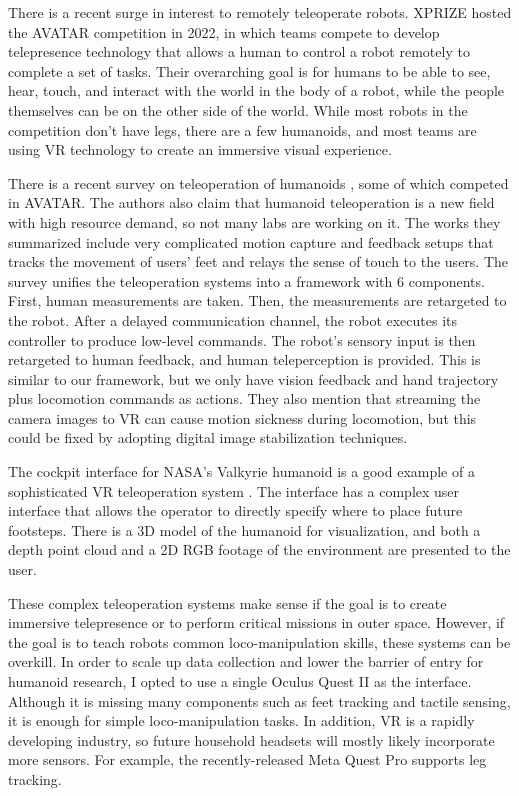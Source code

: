 There is a recent surge in interest to remotely teleoperate robots. 
XPRIZE hosted the AVATAR competition in 2022, in which teams compete to develop telepresence technology that allows a human to control a robot remotely to complete a set of tasks. 
Their overarching goal is for humans to be able to see, hear, touch, and interact with the world in the body of a robot, while the people themselves can be on the other side of the world.
While most robots in the competition don't have legs, there are a few humanoids, and most teams are using VR technology to create an immersive visual experience.

There is a recent survey on teleoperation of humanoids \cite{darvish2023teleoperation},  some of which competed in AVATAR. The authors also claim that humanoid teleoperation is a new field with high resource demand, so not many labs are working on it. The works they summarized include very complicated motion capture and feedback setups that tracks the movement of users' feet and relays the sense of touch to the users. The survey unifies the teleoperation systems into a framework with 6 components. First, human measurements are taken. Then, the measurements are retargeted to the robot. After a delayed communication channel, the robot executes its controller to produce low-level commands. The robot's sensory input is then retargeted to human feedback, and human teleperception is provided.
This is similar to our framework, but we only have vision feedback and hand trajectory plus locomotion commands as actions. They also mention that streaming the camera images to VR can cause motion sickness during locomotion, but this could be fixed by adopting digital image stabilization techniques.

The cockpit interface for NASA's Valkyrie humanoid is a good example of a sophisticated VR teleoperation system \cite{nasa}. The interface has a complex user interface that allows the operator to directly specify where to place future footsteps. There is a 3D model of the humanoid for visualization, and both a depth point cloud and a 2D RGB footage of the environment are presented to the user. 

These complex teleoperation systems make sense if the goal is to create immersive telepresence or to perform critical missions in outer space. However, if the goal is to teach robots common loco-manipulation skills, these systems can be overkill. In order to scale up data collection and lower the barrier of entry for humanoid research, I opted to use a single Oculus Quest II as the interface. Although it is missing many components such as feet tracking and tactile sensing, it is enough for simple loco-manipulation tasks. In addition, VR is a rapidly developing industry, so future household headsets will mostly likely incorporate more sensors. For example, the recently-released Meta Quest Pro supports leg tracking.
